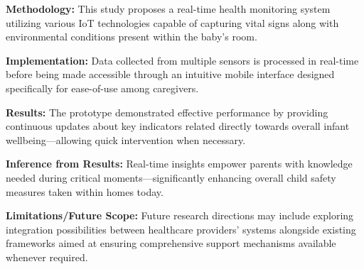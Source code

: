 \documentclass[12pt,a4paper]{report}
\begin{document}
\setlength{\parskip}{1em}  %


\noindent\textbf{Methodology:} This study proposes a real-time health monitoring system utilizing various IoT technologies capable of capturing vital signs along with environmental conditions present within the baby's room.

\setlength{\parskip}{1em}  %


\noindent\textbf{Implementation:} Data collected from multiple sensors is processed in real-time before being made accessible through an intuitive mobile interface designed specifically for ease-of-use among caregivers.
\setlength{\parskip}{1em}  %

\noindent\textbf{Results:} The prototype demonstrated effective performance by providing continuous updates about key indicators related directly towards overall infant wellbeing—allowing quick intervention when necessary.

\setlength{\parskip}{1em}  %


\noindent\textbf{Inference from Results:} Real-time insights empower parents with knowledge needed during critical moments—significantly enhancing overall child safety measures taken within homes today.


\setlength{\parskip}{1em}  %

\noindent\textbf{Limitations/Future Scope:} Future research directions may include exploring integration possibilities between healthcare providers’ systems alongside existing frameworks aimed at ensuring comprehensive support mechanisms available whenever required.
\setlength{\parskip}{1em}  %



\end{document}
